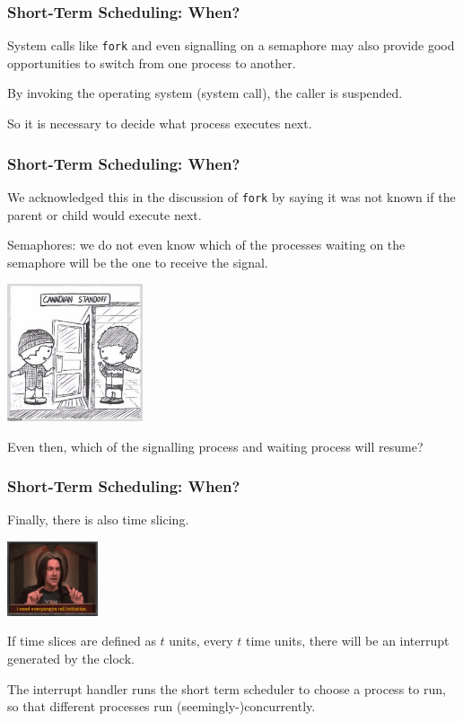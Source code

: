 \begin{frame}
\frametitle{Short-Term Scheduling: When?}

System calls like \texttt{fork} and even signalling on a semaphore may also provide good opportunities to switch from one process to another. 

By invoking the operating system (system call), the caller is suspended.

So it is necessary to decide what process executes next. 

\end{frame}

\begin{frame}
\frametitle{Short-Term Scheduling: When?}

We acknowledged this in the discussion of \texttt{fork} by saying it was not known if the parent or child would execute next. 

Semaphores: we do not even know which of the processes waiting on the semaphore will be the one to receive the signal. 

\begin{center}
	\includegraphics[width=0.3\textwidth]{images/canadianstandoff.jpg}
\end{center}

Even then, which of the signalling process and waiting process will resume?


\end{frame}

\begin{frame}
\frametitle{Short-Term Scheduling: When?}

Finally, there is also time slicing. 

\begin{center}
	\includegraphics[width=0.2\textwidth]{images/initiative.jpg}
\end{center}

If time slices are defined as $t$ units, every $t$ time units, there will be an interrupt generated by the clock.

The interrupt handler runs the short term scheduler to choose a process to run, so that different processes run (seemingly-)concurrently.


\end{frame}

